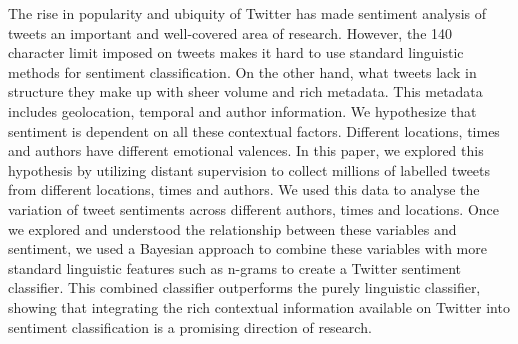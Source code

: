 The rise in popularity and ubiquity of Twitter has made sentiment analysis of tweets an important and well-covered area of research. However, the 140 character limit imposed on tweets makes it hard to use standard linguistic methods for sentiment classification. On the other hand, what tweets lack in structure they make up with sheer volume and rich metadata. This metadata includes geolocation, temporal and author information. We hypothesize that sentiment is dependent on all these contextual factors. Different locations, times and authors have different emotional valences. In this paper, we explored this hypothesis by utilizing distant supervision to collect millions of labelled tweets from different locations, times and authors. We used this data to analyse the variation of tweet sentiments across different authors, times and locations. Once we explored and understood the relationship between these variables and sentiment, we used a Bayesian approach to combine these variables with more standard linguistic features such as n-grams to create a Twitter sentiment classifier. This combined classifier outperforms the purely linguistic classifier, showing that integrating the rich contextual information available on Twitter into sentiment classification is a promising direction of research.
